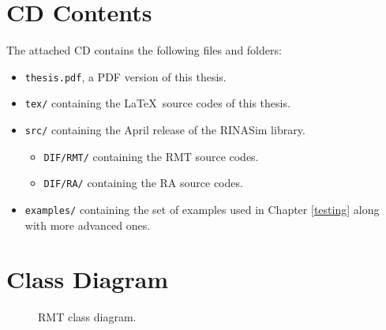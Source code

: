 \chapter{CD Contents}
    The attached CD contains the following files and folders:

    \begin{itemize}
        \item \texttt{thesis.pdf}, a PDF version of this thesis.
        \item \texttt{tex/} containing the \LaTeX~source codes of this thesis.
        \item \texttt{src/} containing the April release of the RINASim library.
        \begin{itemize}
            \item \texttt{DIF/RMT/} containing the RMT source codes.
            \item \texttt{DIF/RA/} containing the RA source codes.
        \end{itemize}
        \item \texttt{examples/} containing the set of examples used in Chapter \ref{testing} along with more advanced ones.
    \end{itemize}

\chapter{Class Diagram}\label{appendix:class}
    \newpage
    \begin{figure}[H]
        \begin{center}
          \caption{RMT class diagram.}
          \label{fig:rinasim:rmt-erd}
        \end{center}
    \end{figure}